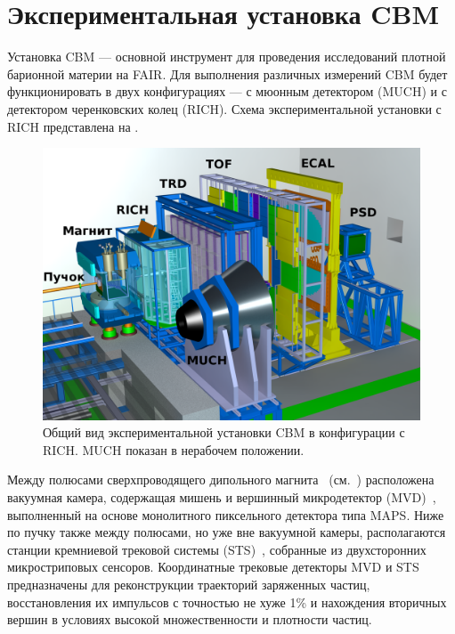 \section{Экспериментальная установка CBM}\label{sec:secCbmSetup}


Установка CBM --- основной инструмент для проведения исследований плотной барионной материи на FAIR. Для выполнения различных измерений CBM будет функционировать в двух конфигурациях --- с мюонным детектором (MUCH) и с детектором черенковских колец (RICH). Схема экспериментальной установки с RICH представлена на .

\begin{figure}[H]
\includegraphics[width=1.0\textwidth]{pictures/1_CBM_SIS100_with_names.png}
\caption{Общий вид экспериментальной установки CBM в конфигурации с RICH. MUCH показан в нерабочем положении.}
\label{fig:CBM}
\end{figure}

Между полюсами сверхпроводящего дипольного магнита~\cite{TDR_Magnet} (см.~) расположена вакуумная камера, содержащая мишень и вершинный микродетектор (MVD)~\cite{MVD_KOZIEL}, выполненный на основе монолитного пиксельного детектора типа MAPS. Ниже по пучку также между полюсами, но уже вне вакуумной камеры, располагаются станции кремниевой трековой системы (STS)~\cite{TDR_STS}, собранные из двухсторонних микростриповых сенсоров. Координатные трековые детекторы MVD и STS предназначены для реконструкции траекторий заряженных частиц, восстановления их импульсов с точностью не хуже 1\% и нахождения вторичных вершин в условиях высокой множественности и плотности частиц.

